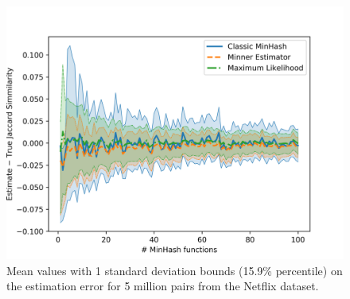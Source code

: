 \begin{figure}[h]
   \centering
   \includegraphics[trim=0 0 35 40,clip,width=\linewidth]{figures/var2}
   \caption{
      Mean values with 1 standard deviation bounds (15.9\% percentile)
      on the estimation error for 5 million pairs from the Netflix dataset.
   }
   \label{fig:var}
\end{figure}
